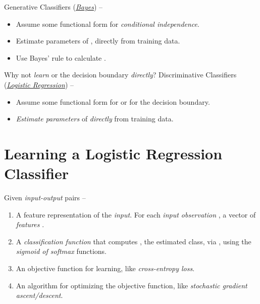 \documentclass[
	number={4},
	title={Logistic Regression}
]{cs584notes}
\begin{document}
Generative Classifiers (\hyperref[eq:mle]{\emph{\Naive Bayes}}) --
\begin{itemize}
	\item Assume some functional form for \emph{conditional independence}.
	\item Estimate parameters of ,  directly from training data.
	\item Use Bayes' rule to calculate .
\end{itemize}

Why not \emph{learn}  or the decision boundary \emph{directly}?
Discriminative Classifiers (\hyperref[eq:map]{\emph{Logistic Regression}}) --
\begin{itemize}
	\item Assume some functional form for  or for the decision boundary.
	\item \emph{Estimate parameters} of  \emph{directly} from training data.
\end{itemize}

\section{Learning a Logistic Regression Classifier}\label{sec:learning-a-logisitc-regression-classifier}
Given  \emph{input-output} pairs --
\begin{enumerate}
	\item A feature representation of the \emph{input}.
	For each \emph{input observation} , a vector of \emph{features} \data{$[x_{1}, x_{2}, \dots, x_{d}]$}.
	\item A \emph{classification function} that computes , the estimated class, via , using the \emph{sigmoid of softmax} functions.
	\item An objective function for learning, like \emph{cross-entropy loss}.
	\item An algorithm for optimizing the objective function, like \emph{stochastic gradient ascent/descent}.
\end{enumerate}
\end{document}
